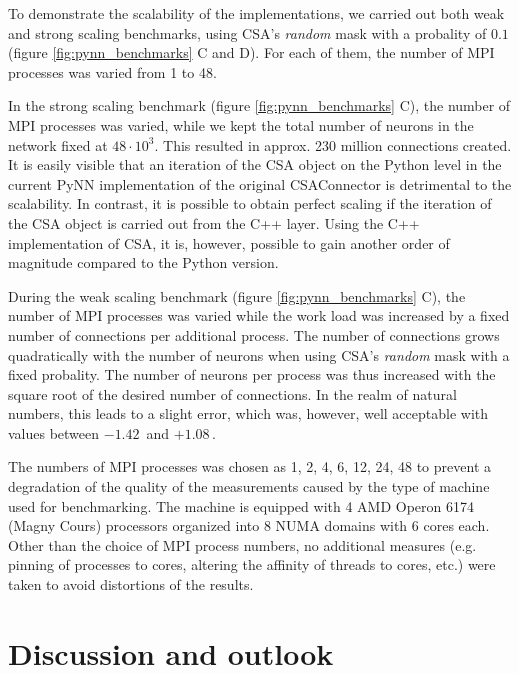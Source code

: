 \documentclass{frontiersSCNS} %
\newcommand{\permil}{\,\textperthousand\xspace}
\begin{document}
To demonstrate the scalability of the implementations, we carried out
both weak and strong scaling benchmarks, using CSA's \emph{random}
mask with a probality of $0.1$ (figure \ref{fig:pynn_benchmarks} C and
D). For each of them, the number of MPI processes was varied from 1 to
48.

In the strong scaling benchmark (figure \ref{fig:pynn_benchmarks} C),
the number of MPI processes was varied, while we kept the total number
of neurons in the network fixed at $48 \cdot 10^3$. This resulted in
approx. 230 million connections created. It is easily visible that an
iteration of the CSA object on the Python level in the current PyNN
implementation of the original CSAConnector is detrimental to the
scalability. In contrast, it is possible to obtain perfect scaling if
the iteration of the CSA object is carried out from the C++
layer. Using the C++ implementation of CSA, it is, however, possible
to gain another order of magnitude compared to the Python version.

During the weak scaling benchmark (figure \ref{fig:pynn_benchmarks}
C), the number of MPI processes was varied while the work load was
increased by a fixed number of connections per additional process.
The number of connections grows quadratically with the number of
neurons when using CSA's \emph{random} mask with a fixed
probality. The number of neurons per process was thus increased with
the square root of the desired number of connections. In the realm of
natural numbers, this leads to a slight error, which was, however,
well acceptable with values between $-1.42$\permil and $+1.08$\permil.

The numbers of MPI processes was chosen as 1, 2, 4, 6, 12, 24, 48 to
prevent a degradation of the quality of the measurements caused by the
type of machine used for benchmarking. The machine is equipped with 4
AMD Operon 6174 (Magny Cours) processors organized into 8 NUMA domains
with 6 cores each. Other than the choice of MPI process numbers, no
additional measures (e.g. pinning of processes to cores, altering the
affinity of threads to cores, etc.) were taken to avoid distortions of
the results.


\section{Discussion and outlook}
\end{document}

